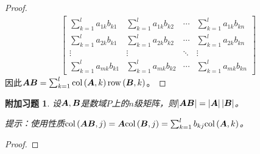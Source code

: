 \documentclass{ctexart}
\newtheorem{extraprob}{附加习题}[section]
\begin{document}
\begin{proof}
\begin{align*}
\begin{bmatrix}
            \sum_{k=1}^la_{1k}b_{k1} & \sum_{k=1}^la_{1k}b_{k2} & \cdots & \sum_{k=1}^la_{1k}b_{kn} \\
            \sum_{k=1}^la_{2k}b_{k1} & \sum_{k=1}^la_{2k}b_{k2} & \cdots & \sum_{k=1}^la_{2k}b_{kn} \\
            \vdots                   & \vdots                   & \ddots & \vdots                   \\
            \sum_{k=1}^la_{mk}b_{k1} & \sum_{k=1}^la_{mk}b_{k2} & \cdots & \sum_{k=1}^la_{mk}b_{kn}
        \end{bmatrix}
    \end{align*}
    因此\(\boldsymbol{A}\boldsymbol{B}=\sum_{k=1}^l\mathrm{col}\left( \boldsymbol{A},k \right)\mathrm{row}\left( \boldsymbol{B},k \right)\)。
\end{proof}

\begin{extraprob}
    设\(\boldsymbol{A},\boldsymbol{B}\)是数域\(P\)上的\(n\)级矩阵，则\(\left|\boldsymbol{A}\boldsymbol{B} \right|=\left|\boldsymbol{A} \right|\left|\boldsymbol{B} \right|\)。

    提示：使用性质\(\mathrm{col}\left( \boldsymbol{A}\boldsymbol{B},j \right)=\boldsymbol{A}\mathrm{col}\left( \boldsymbol{B},j \right)=\sum_{k=1}^lb_{kj}\mathrm{col}\left( \boldsymbol{A},k \right)\)。
\end{extraprob}
\begin{proof}

\end{proof}
\end{document}
